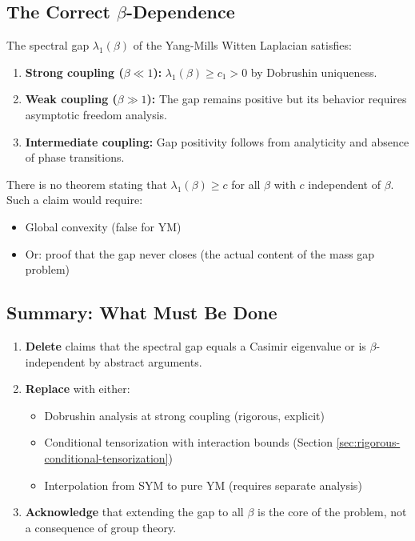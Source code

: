 \subsection{The Correct \texorpdfstring{$\beta$}{beta}-Dependence}

\begin{theorem}\label{thm:beta-gap}
The spectral gap $\lambda_1(\beta)$ of the Yang-Mills Witten Laplacian satisfies:
\begin{enumerate}
    \item \textbf{Strong coupling ($\beta \ll 1$):} $\lambda_1(\beta) \geq c_1 > 0$ by Dobrushin uniqueness.
    \item \textbf{Weak coupling ($\beta \gg 1$):} The gap remains positive but its behavior requires asymptotic freedom analysis.
    \item \textbf{Intermediate coupling:} Gap positivity follows from analyticity and absence of phase transitions.
\end{enumerate}
\end{theorem}

\begin{remark}
There is no theorem stating that $\lambda_1(\beta) \geq c$ for all $\beta$ with $c$ independent of $\beta$. Such a claim would require:
\begin{itemize}
    \item Global convexity (false for YM)
    \item Or: proof that the gap never closes (the actual content of the mass gap problem)
\end{itemize}
\end{remark}

\subsection{Summary: What Must Be Done}

\begin{enumerate}
    \item \textbf{Delete} claims that the spectral gap equals a Casimir eigenvalue or is $\beta$-independent by abstract arguments.
    
    \item \textbf{Replace} with either:
    \begin{itemize}
        \item Dobrushin analysis at strong coupling (rigorous, explicit)
        \item Conditional tensorization with interaction bounds (Section \ref{sec:rigorous-conditional-tensorization})
        \item Interpolation from SYM to pure YM (requires separate analysis)
    \end{itemize}
    
    \item \textbf{Acknowledge} that extending the gap to all $\beta$ is the core of the problem, not a consequence of group theory.
\end{enumerate}



